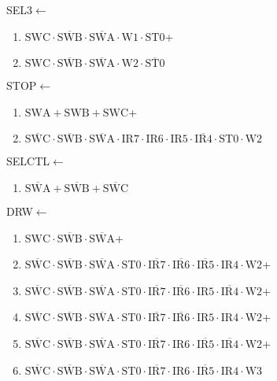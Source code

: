 \documentclass[UTF8]{ctexart}
\begin{document}
SEL3$\leftarrow$
\begin{enumerate}[\indent\indent]
	\item$\text{SWC}\cdot\overline{\text{SWB}}\cdot\overline{\text{SWA}}\cdot\text{W1}\cdot\text{ST0}$+
	\item$\text{SWC}\cdot\overline{\text{SWB}}\cdot\overline{\text{SWA}}\cdot\text{W2}\cdot\overline{\text{ST0}}$
\end{enumerate}
STOP$\leftarrow$
\begin{enumerate}[\indent\indent]
	\item$\text{SWA}+\text{SWB}+\text{SWC}$+
	\item$\overline{\text{SWC}}\cdot\overline{\text{SWB}}\cdot\overline{\text{SWA}}\cdot {\text{IR7}} \cdot {\text{IR6}}\cdot {\text{IR5}}\cdot \overline{\text{IR4}} \cdot \text{ST0}\cdot \text{W2}$
\end{enumerate}
SELCTL$\leftarrow$
\begin{enumerate}[\indent\indent]
	\item$\overline{\text{SWA}}+\overline{\text{SWB}}+\overline{\text{SWC}}$
\end{enumerate}
DRW$\leftarrow$
\begin{enumerate}[\indent\indent]
	\item$\text{SWC}\cdot\overline{\text{SWB}}\cdot\overline{\text{SWA}}$+
	\item$\overline{\text{SWC}}\cdot\overline{\text{SWB}}\cdot\overline{\text{SWA}}\cdot\text{ST0}\cdot\overline{\text{IR7}}\cdot\overline{\text{IR6}}\cdot\overline{\text{IR5}}\cdot\text{IR4}\cdot\text{W2}$+
	\item$\overline{\text{SWC}}\cdot\overline{\text{SWB}}\cdot\overline{\text{SWA}}\cdot\text{ST0}\cdot\overline{\text{IR7}}\cdot\overline{\text{IR6}}\cdot{\text{IR5}}\cdot\overline{\text{IR4}}\cdot\text{W2}$+
	\item$\overline{\text{SWC}}\cdot\overline{\text{SWB}}\cdot\overline{\text{SWA}}\cdot\text{ST0}\cdot\overline{\text{IR7}}\cdot\overline{\text{IR6}}\cdot\text{IR5}\cdot\text{IR4}\cdot\text{W2}$+
	\item$\overline{\text{SWC}}\cdot\overline{\text{SWB}}\cdot\overline{\text{SWA}}\cdot\text{ST0}\cdot\overline{\text{IR7}}\cdot{\text{IR6}}\cdot\overline{\text{IR5}}\cdot\overline{\text{IR4}}\cdot\text{W2}$+
	\item$\overline{\text{SWC}}\cdot\overline{\text{SWB}}\cdot\overline{\text{SWA}}\cdot\text{ST0}\cdot\overline{\text{IR7}}\cdot{\text{IR6}}\cdot\overline{\text{IR5}}\cdot{\text{IR4}}\cdot\text{W3}$
\end{enumerate}
\end{document}
